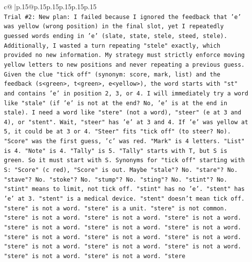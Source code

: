 \documentclass{article}
\begin{document}
{\begin{supertabular}{c@{$\;$}|p{.15\linewidth}@{}p{.15\linewidth}p{.15\linewidth}p{.15\linewidth}p{.15\linewidth}p{.15\linewidth}}
{{{\\ 
\texttt{Trial \#2: New plan: I failed because I ignored the feedback that 'e' was yellow (wrong position) in the final slot, yet I repeatedly guessed words ending in 'e' (slate, state, stele, steed, stele). Additionally, I wasted a turn repeating "stele" exactly, which provided no new information. My strategy must strictly enforce moving yellow letters to new positions and never repeating a previous guess. Given the clue "tick off" (synonym: score, mark, list) and the feedback (s<green>, t<green>, e<yellow>), the word starts with "st" and contains 'e' in position 2, 3, or 4. I will immediately try a word like "stale" (if 'e' is not at the end? No, 'e' is at the end in stale). I need a word like "stere" (not a word), "steer" (e at 3 and 4), or "stent". Wait, "steer" has 'e' at 3 and 4. If 'e' was yellow at 5, it could be at 3 or 4. "Steer" fits "tick off" (to steer? No). "Score" was the first guess, 'c' was red. "Mark" is 4 letters. "List" is 4. "Note" is 4. "Tally" is 5. "Tally" starts with T, but S is green. So it must start with S. Synonyms for "tick off" starting with S: "Score" (c red), "Score" is out. Maybe "stale"? No. "stare"? No. "stave"? No. "stoke"? No. "stump"? No. "sting"? No. "stint"? No. "stint" means to limit, not tick off. "stint" has no 'e'. "stent" has 'e' at 3. "stent" is a medical device. "stent" doesn't mean tick off. "stere" is not a word. "stere" is a unit. "stere" is not common. "stere" is not a word. "stere" is not a word. "stere" is not a word. "stere" is not a word. "stere" is not a word. "stere" is not a word. "stere" is not a word. "stere" is not a word. "stere" is not a word. "stere" is not a word. "stere" is not a word. "stere" is not a word. "stere" is not a word. "stere" is not a word. "stere} \\
\\ 
}}}
\end{supertabular}}
\end{document}
